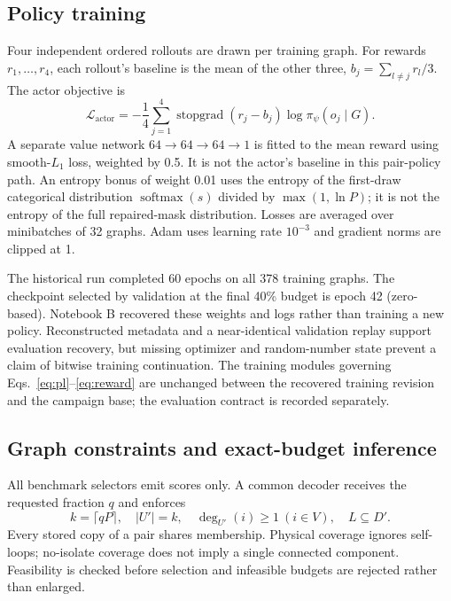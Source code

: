 \subsection{Policy training}
\label{sec:training}
Four independent ordered rollouts are drawn per training graph. For rewards $r_1,\ldots,r_4$, each rollout's baseline is the mean of the other three, $b_j=\sum_{l\ne j}r_l/3$. The actor objective is
\begin{equation}
 \mathcal L_{\mathrm{actor}}=-\frac14\sum_{j=1}^4
 \operatorname{stopgrad}(r_j-b_j)\log\pi_\psi(o_j\mid G).
\end{equation}
A separate value network $64\to64\to64\to1$ is fitted to the mean reward using smooth-$L_1$ loss, weighted by 0.5. It is not the actor's baseline in this pair-policy path. An entropy bonus of weight 0.01 uses the entropy of the first-draw categorical distribution $\operatorname{softmax}(s)$ divided by $\max(1,\ln P)$; it is not the entropy of the full repaired-mask distribution. Losses are averaged over minibatches of 32 graphs. Adam uses learning rate $10^{-3}$ and gradient norms are clipped at 1.

The historical run completed 60 epochs on all 378 training graphs. The checkpoint selected by validation at the final 40\% budget is epoch 42 (zero-based). Notebook B recovered these weights and logs rather than training a new policy. Reconstructed metadata and a near-identical validation replay support evaluation recovery, but missing optimizer and random-number state prevent a claim of bitwise training continuation. The training modules governing Eqs.~\ref{eq:pl}--\ref{eq:reward} are unchanged between the recovered training revision and the campaign base; the evaluation contract is recorded separately.

\subsection{Graph constraints and exact-budget inference}
\label{sec:constraints}
All benchmark selectors emit scores only. A common decoder receives the requested fraction $q$ and enforces
\begin{equation}
 k=\lceil qP\rceil,\quad |U'|=k,\quad
 \deg_{U'}(i)\ge1\ (i\in V),\quad L\subseteq D'.
 \label{eq:constraints}
\end{equation}
Every stored copy of a pair shares membership. Physical coverage ignores self-loops; no-isolate coverage does not imply a single connected component. Feasibility is checked before selection and infeasible budgets are rejected rather than enlarged.

